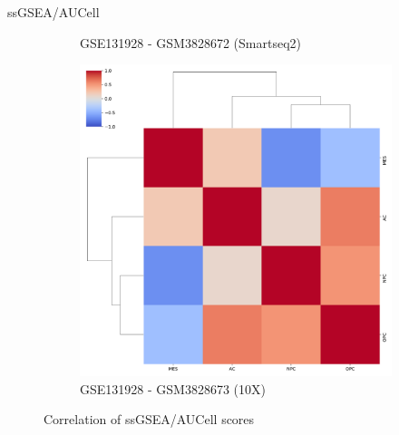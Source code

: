 \documentclass[aspectratio=169,9pt]{beamer}
\begin{document}
\begin{frame}{ssGSEA/AUCell}
\begin{adjustwidth}{-5cm}{-5cm}
\begin{figure}
\begin{subfigure}[b]{0.38\textwidth}
                    \caption{GSE131928 - GSM3828672 (Smartseq2)}
                \end{subfigure}
                \begin{subfigure}[b]{0.38\textwidth}
                    \centering
                    \includegraphics[width=\textwidth]{AUCell_GSM3828673_corrplot_4D}
                    \caption{GSE131928 - GSM3828673 (10X)}
                \end{subfigure}
                \caption{Correlation of ssGSEA/AUCell scores}
            \end{figure}
        \end{adjustwidth}
    \end{frame}
\end{document}
